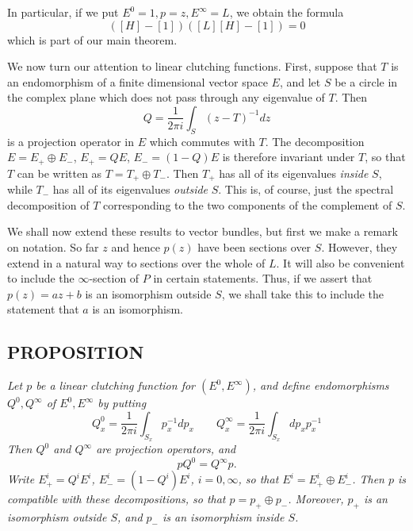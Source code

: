 In particular, if we put $E^0 = 1, p = z, E^\infty = L$, we obtain the formula
\begin{equation*}
    ([H] - [1])([L][H] - [1]) = 0
\end{equation*}
which is part of our main theorem. \par 

We now turn our attention to linear clutching functions. First, suppose that $T$ is an endomorphism of a finite dimensional vector space $E$, and let $S$ be a circle in the complex plane which does not pass through any eigenvalue of $T$. Then
\begin{equation*}
    Q = \frac{1}{2 \pi i} \int_S (z - T)^{-1} dz
\end{equation*}
is a projection operator in $E$ which commutes with $T$. The decomposition $E = E_+ \oplus E_-$, $E_+ = QE$, $E_- = (1 - Q)E$ is therefore invariant under $T$, so that $T$ can be written as $T = T_+ \oplus T_-$. Then $T_+$ has all of its eigenvalues \textit{inside} $S$, while $T_-$ has all of its eigenvalues \textit{outside} $S$. This is, of course, just the spectral decomposition of $T$ corresponding to the two components of the complement of $S$. \par 

We shall now extend these results to vector bundles, but first we make a remark on notation. So far $z$ and hence $p(z)$ have been sections over $S$. However, they extend in a natural way to sections over the whole of $L$. It will also be convenient to include the $\infty$-section of $P$ in certain statements. Thus, if we assert that $p(z) = az + b$ is an isomorphism outside $S$, we shall take this to include the statement that $a$ is an isomorphism. \par 

\subsection{PROPOSITION}\label{pro:2.2.8} \textit{Let $p$ be a linear clutching
function for $(E^0, E^\infty)$, and define endomorphisms $Q^0, Q^\infty$ of $E^0, E^\infty$ by putting}
\begin{equation*}
    Q^0_x = \frac{1}{2 \pi i} \int_{S_x} p_x^{-1} dp_x \qquad Q^\infty_x = \frac{1}{2 \pi i} \int_{S_x} dp_x p_x^{-1}
\end{equation*}
\textit{Then $Q^0$ and $Q^\infty$ are projection operators, and}
\begin{equation*}
    pQ^0 = Q^\infty p .
\end{equation*}
\textit{Write $E^i_+ = Q^i E^i$, $E^i_- = (1 - Q^i) E^i$, $i = 0, \infty$, so that $E^i = E^i_+ \oplus E^i_-$. Then $p$ is compatible with these decompositions, so that $p = p_+ \oplus p_-$. Moreover, $p_+$ is an isomorphism outside $S$, and $p_-$ is an isomorphism inside $S$.}

